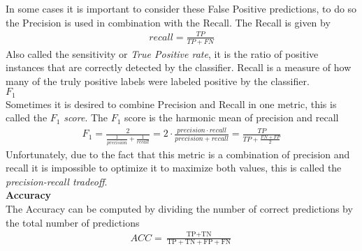 In some cases it is important to consider these False Positive predictions, to do so the Precision is used in combination with the Recall.
The Recall is given by
\begin{align}
    recall = \frac{TP}{TP+FN}
    \label{eq:recall}
\end{align}
Also called the sensitivity or \textit{True Positive rate}, it is the ratio of positive instances that are correctly detected by the classifier.
Recall is a measure of how many of the truly positive labels were labeled positive by the classifier.\\
\textbf{$F_1$}\\
Sometimes it is desired to combine Precision and Recall in one metric, this is called the $F_1$ \textit{score}. The $F_1$ score is the harmonic mean of precision and recall
\begin{align}
    F_1 = \frac{2}{\frac{1}{precision} + \frac{1}{recall}} = 2 \cdot \frac{precision \cdot recall}{precision + recall} = \frac{TP}{TP + \frac{FN+FP}{2}}
    \label{eq:f1}
\end{align}
Unfortunately, due to the fact that this metric is a combination of precision and recall it is impossible to optimize it to maximize both values, this is called the \textit{precision-recall tradeoff}.\\
\textbf{Accuracy}\\
The Accuracy can be computed by dividing the number of correct predictions by the total number of predictions
\begin{align}
    ACC = \frac{
        \text{TP} + \text{TN}
    }{
        \text{TP} + \text{TN} + \text{FP} + \text{FN}
    }
    \label{eq:accuracy}
\end{align}


